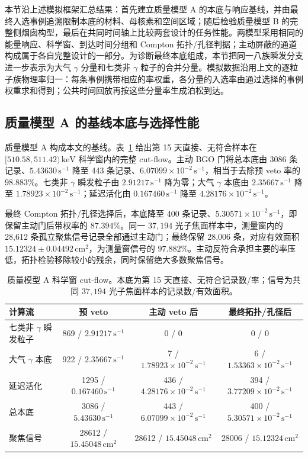 \documentclass[11pt]{article}
\newcommand{\revblue}[1]{\textcolor{revisionblue}{#1}}
\newcommand{\keV}{\,\mathrm{keV}}
\newcommand{\cps}{\,\mathrm{s^{-1}}}
\begin{document}
本节沿上述模拟框架汇总结果：首先建立质量模型 A 的本底与响应基线，并由最终入选事例追溯限制本底的材料、母核素和空间区域；随后检验质量模型 B 的完整侧烟囱构型，最后在共同时间轴上比较两套设计的任务性能。两模型采用相同的能量响应、科学窗、到达时间分组和 Compton 拓扑/孔径判据；主动屏蔽的通道构成属于各自完整设计的一部分。\revblue{为诊断最终本底组成，本节把同一八族瞬发分支进一步表示为大气 $\gamma$ 分量和七类非 $\gamma$ 粒子的合并分量。模拟数据沿用上文的逐粒子族物理率归一：每条事例携带相应的率权重，各分量的入选率由通过选择的事例权重求和得到；公共时间回放再按这些分量率生成泊松到达。}

\subsection{质量模型 A 的基线本底与选择性能}
\label{subsec:model_a_baseline_zh}
\label{subsec:reference_background_results_zh}

质量模型 A 构成本文的基线。表~\ref{tab:phase2_cutflow} 给出第 15 天直接、无符合样本在 $[510.58,511.42)\keV$ 科学窗内的完整 cut-flow。主动 BGO 门将总本底由 3086 条记录、$5.43630\cps$ 降至 443 条记录、$6.07099\times10^{-2}\cps$，相当于去除预 veto 率的 $98.883\%$。\revblue{七类非 $\gamma$ 瞬发粒子}由 $2.91217\cps$ 降为零；\revblue{大气 $\gamma$ 本底}由 $2.35667\cps$ 降至 $1.78923\times10^{-2}\cps$；延迟活化由 $0.167460\cps$ 降至 $4.28176\times10^{-2}\cps$。

最终 Compton 拓扑/孔径选择后，本底降至 400 条记录、$5.30571\times10^{-2}\cps$，即保留主动门后带权率的 $87.394\%$。同一 $37{,}194$ 光子焦面样本中，测量窗内的 28,612 条孤立聚焦信号记录全部通过主动门；最终保留 28,006 条，对应有效面积 $15.12324\pm0.04492\,\mathrm{cm^2}$，为测量窗信号的 $97.882\%$。主动反符合承担主要的率压低，拓扑检验移除较小的残余，同时保留绝大多数聚焦信号。

\begin{table}[H]
\centering
\caption{质量模型 A 科学窗 cut-flow。本底为第 15 天直接、无符合记录数/率；信号为共同 $37{,}194$ 光子焦面样本的记录数/有效面积。}
\label{tab:phase2_cutflow}
\footnotesize
\begin{tabular}{lccc}
\toprule
计算流 & 预 veto & 主动 veto 后 & 最终拓扑/孔径后 \\
\midrule
\revblue{七类非 $\gamma$ 瞬发粒子} & 869 / $2.91217\cps$ & 0 / 0 & 0 / 0 \\
\revblue{大气 $\gamma$ 本底} & 922 / $2.35667\cps$ & 7 / $1.78923\times10^{-2}\cps$ & 6 / $1.53363\times10^{-2}\cps$ \\
延迟活化 & 1295 / $0.167460\cps$ & 436 / $4.28176\times10^{-2}\cps$ & 394 / $3.77209\times10^{-2}\cps$ \\
总本底 & 3086 / $5.43630\cps$ & 443 / $6.07099\times10^{-2}\cps$ & 400 / $5.30571\times10^{-2}\cps$ \\
聚焦信号 & 28612 / $15.45048\,\mathrm{cm^2}$ & 28612 / $15.45048\,\mathrm{cm^2}$ & 28006 / $15.12324\,\mathrm{cm^2}$ \\
\bottomrule
\end{tabular}
\end{table}
\end{document}
